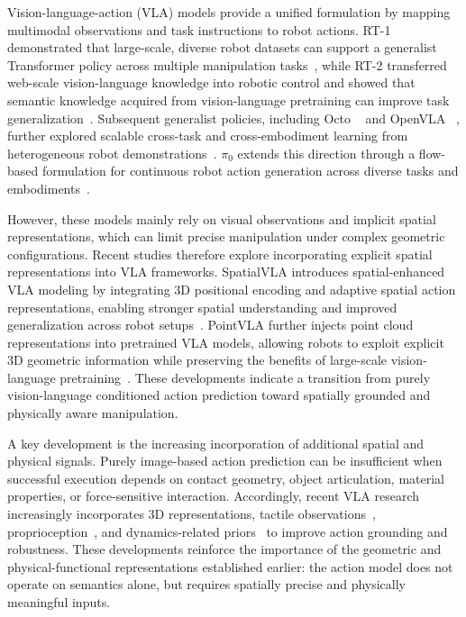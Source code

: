 \documentclass{SCIS2026}
\begin{document}
Vision-language-action (VLA) models provide a unified formulation by mapping multimodal observations and task instructions to robot actions. RT-1 demonstrated that large-scale, diverse robot datasets can support a generalist Transformer policy across multiple manipulation tasks~\cite{brohan2022rt}, while RT-2 transferred web-scale vision-language knowledge into robotic control and showed that semantic knowledge acquired from vision-language pretraining can improve task generalization~\cite{zitkovich2023rt}. Subsequent generalist policies, including Octo ~\cite{team2024octo} and OpenVLA ~\cite{kim2024openvla}, further explored scalable cross-task and cross-embodiment learning from heterogeneous robot demonstrations~\cite{team2024octo,kim2024openvla,openx2023openx}. $\pi_0$ extends this direction through a flow-based formulation for continuous robot action generation across diverse tasks and embodiments~\cite{team2024pi0}.

However, these models mainly rely on visual observations and implicit spatial representations, which can limit precise manipulation under complex geometric configurations. Recent studies therefore explore incorporating explicit spatial representations into VLA frameworks. SpatialVLA introduces spatial-enhanced VLA modeling by integrating 3D positional encoding and adaptive spatial action representations, enabling stronger spatial understanding and improved generalization across robot setups~\cite{qu2025spatialvla}. PointVLA further injects point cloud representations into pretrained VLA models, allowing robots to exploit explicit 3D geometric information while preserving the benefits of large-scale vision-language pretraining~\cite{li2026pointvla}. These developments indicate a transition from purely vision-language conditioned action prediction toward spatially grounded and physically aware manipulation.


A key development is the increasing incorporation of additional spatial and physical signals. Purely image-based action prediction can be insufficient when successful execution depends on contact geometry, object articulation, material properties, or force-sensitive interaction. Accordingly, recent VLA research increasingly incorporates 3D representations, tactile observations~\cite{bi2026vla}, proprioception~\cite{wang2026think}, and dynamics-related priors~\cite{hu2023gaia} to improve action grounding and robustness. These developments reinforce the importance of the geometric and physical-functional representations established earlier: the action model does not operate on semantics alone, but requires spatially precise and physically meaningful inputs.
\end{document}
